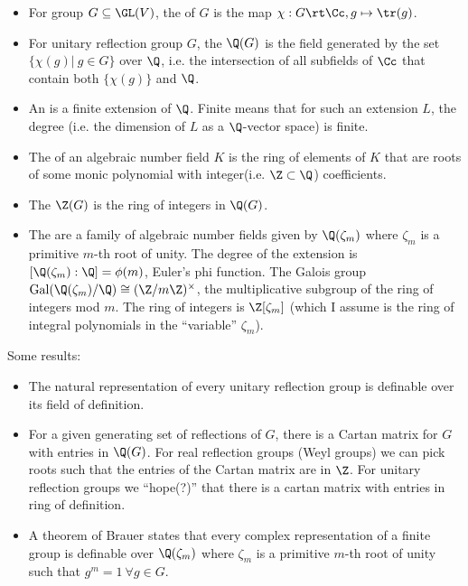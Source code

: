 \begin{definition}\begin{itemize}
  \item For group $G\subseteq \GL(V)$, the  of $G$ is the map $\chi:G\rt \Cc, g\mapsto \tr(g)$.
  
  \item For unitary reflection group $G$, the  $\Q(G)$ is the field generated by the set $\{\chi(g)|\ g\in G\}$ over $\Q$, i.e. the intersection of all subfields of $\Cc$ that contain both $\{\chi(g)\}$ and $\Q$.
  
  \item An  is a finite extension of $\Q$. Finite means that for such an extension $L$, the degree (i.e. the dimension of $L$ as a $\Q$-vector space) is finite.
  
  \item The  of an algebraic number field $K$ is the ring of elements of $K$ that are roots of some monic polynomial with integer(i.e. $\Z\subset \Q$) coefficients.   
  
  \item The  $\Z(G)$ is the ring of integers in $\Q(G)$.
  
  \item The  are a family of algebraic number fields given by $\Q(\zeta_m)$ where $\zeta_m$ is a primitive $m$-th root of unity. The degree of the extension is $[\Q(\zeta_m):\Q]=\phi(m)$, Euler's phi function. The Galois group $\text{Gal}(\Q(\zeta_m)/\Q)\cong (\Z/m\Z)^\times$, the multiplicative subgroup of the ring of integers mod $m$. The ring of integers is $\Z[\zeta_m]$ (which I assume is the ring of integral polynomials in the ``variable''  $\zeta_m$).
\end{itemize}
\end{definition}

\nt Some results:
\begin{itemize}
  \item The natural representation of every unitary reflection group is definable over its field of definition.
  
  \item For a given generating set of reflections of $G$, there is a Cartan matrix for $G$ with entries in $\Q(G)$. For real reflection groups (Weyl groups) we can pick roots such that the entries of the Cartan matrix are in $\Z$. For unitary reflection groups we ``hope(?)''  that there is a cartan matrix with entries in ring of definition.

  \item A theorem of Brauer states that every complex representation of a finite group is definable over $\Q(\zeta_m)$ where $\zeta_m$ is a primitive $m$-th root of unity such that $g^m=1\ \forall g\in G$.
\end{itemize}



